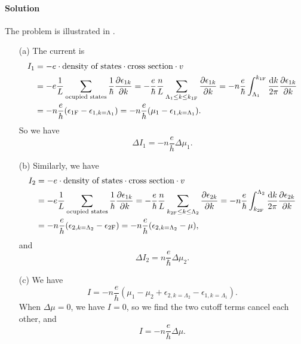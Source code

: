 \documentclass[hyperref, a4paper]{article}
\begin{document}
\paragraph{Solution} The problem is illustrated in .
\begin{itemize}
\item[(a)] The current is 
\begin{equation}
    \begin{aligned}
        I_1 &= - e \cdot \text{density of states} \cdot \text{cross section} \cdot v \\
        &= - e \frac{1}{L} \sum_{\text{ocupied states}} \frac{1}{\hbar} \pdv{\epsilon_{1k}}{k} 
        = - \frac{e}{\hbar} \frac{n}{L} \sum_{\Lambda_1 \leq k \leq k_{\text{1F}}} \pdv{\epsilon_{1k}}{k} 
        = - n \frac{e}{\hbar} \int_{\Lambda_1}^{k_{\text{1F}}} \frac{\dd{k}}{2\pi} \pdv{\epsilon_{1k}}{k} \\
        &= - n \frac{e}{h} (\epsilon_{1 \text{F}} - \epsilon_{1, k = \Lambda_1})
        = - n \frac{e}{h} (\mu_1 - \epsilon_{1, k = \Lambda_1}).
    \end{aligned}
\end{equation}
So we have 
\begin{equation}
    \Delta I_1 = - n \frac{e}{h} \Delta \mu_1.
\end{equation}

\item[(b)] Similarly, we have 
\begin{equation}
    \begin{aligned}
        I_2 &= - e \cdot \text{density of states} \cdot \text{cross section} \cdot v \\
        &= - e \frac{1}{L} \sum_{\text{ocupied states}} \frac{1}{\hbar} \pdv{\epsilon_{1k}}{k} 
         = - \frac{e}{\hbar} \frac{n}{L} \sum_{k_{2\text{F}} \leq k \leq \Lambda_2} \pdv{\epsilon_{2k}}{k} 
         = - n \frac{e}{\hbar} \int^{\Lambda_2}_{k_{2\text{F}}} \frac{\dd{k}}{2\pi} \pdv{\epsilon_{2k}}{k} \\
        &= - n \frac{e}{h} (\epsilon_{2, k = \Lambda_2} - \epsilon_{2 \text{F}}) 
         = - n \frac{e}{h} (\epsilon_{2, k = \Lambda_2} - \mu) , 
    \end{aligned}
\end{equation}
and 
\begin{equation}
    \Delta I_2 = n \frac{e}{\hbar} \Delta \mu_2.
\end{equation}

\item[(c)] We have 
\begin{equation}
    I = - n \frac{e}{h} (\mu_1 - \mu_2 + \epsilon_{2, k = \Lambda_2} - \epsilon_{1, k = \Lambda_1}).
\end{equation}
When $\Delta \mu = 0$, we have $I = 0$, so we find the two cutoff terms cancel each other, and 
\begin{equation}
    I = - n \frac{e}{h} \Delta \mu.
\end{equation}


\end{itemize}
\end{document}
